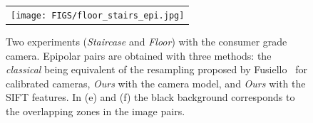 \documentclass{ipol}
\begin{document}
    
    


\begin{figure}%
\centering
\begin{tabular}{c}
\texttt{[image: FIGS/floor\_stairs\_epi.jpg]}
\end{tabular}
\caption{Two experiments (\textit{Staircase} and \textit{Floor}) with the consumer grade camera. Epipolar pairs are obtained with three methods: the \textit{classical} being equivalent of the resampling proposed by Fusiello~\cite{fusiello2000epi} for calibrated cameras, \textit{Ours} with the camera model, and \textit{Ours} with the SIFT features. In (e) and (f) the black background corresponds to the overlapping zones in the image pairs.}
 
\label{ExpConsumerCam}
\end{figure}

 





%
%
%
\end{document}

